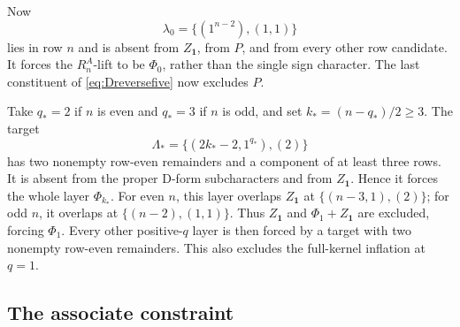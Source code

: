 \documentclass[11pt]{article}
\numberwithin{equation}{section}
\theoremstyle{definition}
\newcommand{\one}{\mathbf 1}
\begin{document}
Now
\[
 \lambda_0=\{(1^{n-2}),(1,1)\}
\]
lies in row \(n\) and is absent from \(Z_{\one}\), from \(P\), and from every other row candidate.
It forces the \(R_n^A\)-lift to be \(\Phi_0\), rather than the single sign character.
The last constituent of \eqref{eq:Dreversefive} now excludes \(P\).

Take \(q_*=2\) if \(n\) is even and \(q_*=3\) if \(n\) is odd, and set \(k_*=(n-q_*)/2\geq3\).
The target
\[
 \Lambda_*=\{(2k_*-2,1^{q_*}),(2)\}
\]
has two nonempty row-even remainders and a component of at least three rows.
It is absent from the proper D-form subcharacters and from \(Z_{\one}\).
Hence it forces the whole layer \(\Phi_{k_*}\).
For even \(n\), this layer overlaps \(Z_{\one}\) at
\(\{(n-3,1),(2)\}\); for odd \(n\), it overlaps at
\(\{(n-2),(1,1)\}\).
Thus \(Z_{\one}\) and \(\Phi_1+Z_{\one}\) are excluded, forcing \(\Phi_1\).
Every other positive-\(q\) layer is then forced by a target with two nonempty row-even remainders.
This also excludes the full-kernel inflation at \(q=1\).

\subsection{The associate constraint}
\end{document}
